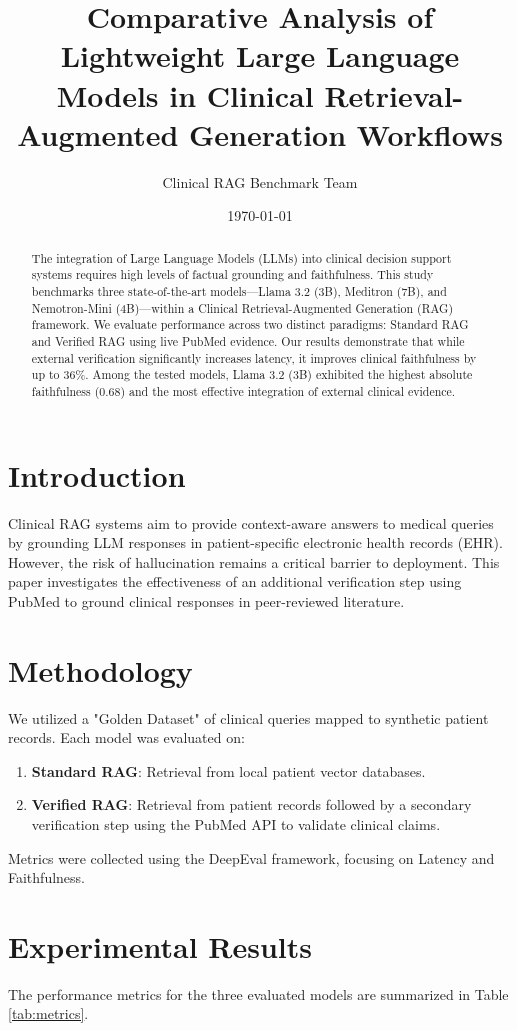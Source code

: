 \documentclass[twocolumn,10pt]{article}
\title{\textbf{Comparative Analysis of Lightweight Large Language Models in Clinical Retrieval-Augmented Generation Workflows}}
\author{Clinical RAG Benchmark Team}
\date{\today}
\begin{document}
\maketitle

\begin{abstract}
The integration of Large Language Models (LLMs) into clinical decision support systems requires high levels of factual grounding and faithfulness. This study benchmarks three state-of-the-art models---Llama 3.2 (3B), Meditron (7B), and Nemotron-Mini (4B)---within a Clinical Retrieval-Augmented Generation (RAG) framework. We evaluate performance across two distinct paradigms: Standard RAG and Verified RAG using live PubMed evidence. Our results demonstrate that while external verification significantly increases latency, it improves clinical faithfulness by up to 36\%. Among the tested models, Llama 3.2 (3B) exhibited the highest absolute faithfulness (0.68) and the most effective integration of external clinical evidence.
\end{abstract}

\section{Introduction}
Clinical RAG systems aim to provide context-aware answers to medical queries by grounding LLM responses in patient-specific electronic health records (EHR). However, the risk of hallucination remains a critical barrier to deployment. This paper investigates the effectiveness of an additional verification step using PubMed to ground clinical responses in peer-reviewed literature.

\section{Methodology}
We utilized a "Golden Dataset" of clinical queries mapped to synthetic patient records. Each model was evaluated on:
\begin{enumerate}
    \item \textbf{Standard RAG}: Retrieval from local patient vector databases.
    \item \textbf{Verified RAG}: Retrieval from patient records followed by a secondary verification step using the PubMed API to validate clinical claims.
\end{enumerate}
Metrics were collected using the DeepEval framework, focusing on Latency and Faithfulness.

\section{Experimental Results}
The performance metrics for the three evaluated models are summarized in Table \ref{tab:metrics}.
\end{document}
